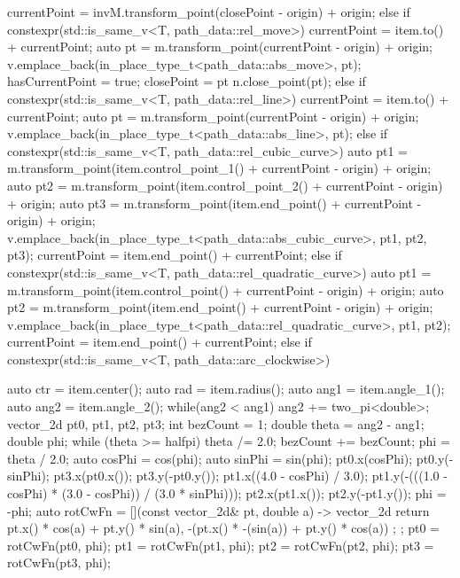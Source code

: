 \begin{codeblock}
{{{{          currentPoint = invM.transform_point(closePoint - origin) + origin;
        }
      }
      else if constexpr(std::is_same_v<T, path_data::rel_move>) {
        currentPoint = item.to() + currentPoint;
        auto pt = m.transform_point(currentPoint - origin) + origin;
        v.emplace_back(in_place_type_t<path_data::abs_move>, pt);
        hasCurrentPoint = true;
        closePoint = pt    
        n.close_point(pt);
      }
      else if constexpr(std::is_same_v<T, path_data::rel_line>) {
        currentPoint = item.to() + currentPoint;
        auto pt = m.transform_point(currentPoint - origin) + origin;
        v.emplace_back(in_place_type_t<path_data::abs_line>, pt);
      }
      else if constexpr(std::is_same_v<T, path_data::rel_cubic_curve>) {
        auto pt1 = m.transform_point(item.control_point_1() + currentPoint -
        origin) + origin;
        auto pt2 = m.transform_point(item.control_point_2() + currentPoint -
        origin) + origin;
        auto pt3 = m.transform_point(item.end_point() + currentPoint - origin) +
          origin;
        v.emplace_back(in_place_type_t<path_data::abs_cubic_curve>,
          pt1, pt2, pt3);
        currentPoint = item.end_point() + currentPoint;
      }
      else if constexpr(std::is_same_v<T,
      path_data::rel_quadratic_curve>) {
      	auto pt1 = m.transform_point(item.control_point() + currentPoint -
      	  origin) + origin;
      	auto pt2 = m.transform_point(item.end_point() + currentPoint -
      	  origin) + origin;
      	v.emplace_back(in_place_type_t<path_data::rel_quadratic_curve>,
      	pt1, pt2);
      	currentPoint = item.end_point() + currentPoint;
      }
      else if constexpr(std::is_same_v<T, path_data::arc_clockwise>) {
        auto ctr = item.center();
        auto rad = item.radius();
        auto ang1 = item.angle_1();
        auto ang2 = item.angle_2();
        while(ang2 < ang1) {
          ang2 += two_pi<double>;
        }
        vector_2d pt0, pt1, pt2, pt3;
        int bezCount = 1;
        double theta = ang2 - ang1;
        double phi;
        while (theta >= halfpi) {
          theta /= 2.0;
          bezCount += bezCount;
        }
        phi = theta / 2.0;
        auto cosPhi = cos(phi);
        auto sinPhi = sin(phi);
        pt0.x(cosPhi);
        pt0.y(-sinPhi);
        pt3.x(pt0.x());
        pt3.y(-pt0.y());
        pt1.x((4.0 - cosPhi) / 3.0);
        pt1.y(-(((1.0 - cosPhi) * (3.0 - cosPhi)) / (3.0 * sinPhi)));
        pt2.x(pt1.x());
        pt2.y(-pt1.y());
        phi = -phi;
        auto rotCwFn = [](const vector_2d& pt, double a) -> vector_2d {
          return { pt.x() * cos(a) + pt.y() * sin(a),
            -(pt.x() * -(sin(a)) + pt.y() * cos(a)) };
        };
        pt0 = rotCwFn(pt0, phi);
        pt1 = rotCwFn(pt1, phi);
        pt2 = rotCwFn(pt2, phi);
        pt3 = rotCwFn(pt3, phi);
        
}}}
\end{codeblock}
